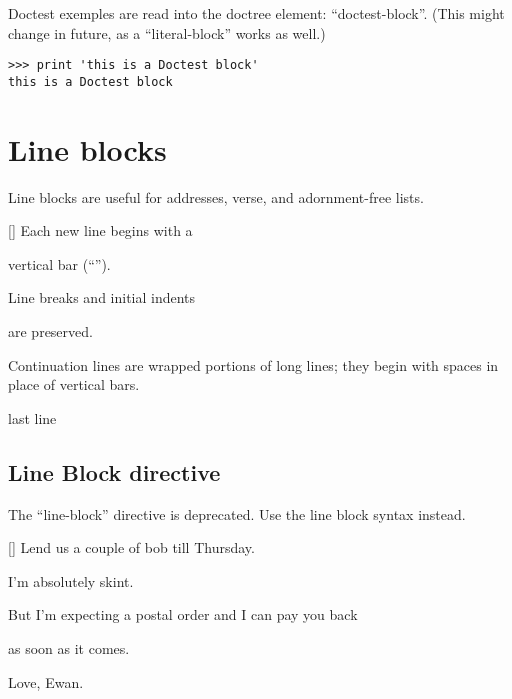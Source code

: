 \documentclass[10pt,a4paper,english]{article}
\newlength{\lineblockindentation}
\newenvironment{lineblock}[1]
{\begin{list}{}
  {\setlength{\partopsep}{\parskip}
   \addtolength{\partopsep}{\baselineskip}
   \topsep0pt\itemsep0.15\baselineskip\parsep0pt
   \leftmargin#1}
 \raggedright}
{\end{list}}
\begin{document}
Doctest exemples are read into the doctree element: ``doctest-block''.
(This might change in future, as a ``literal-block'' works as well.)
\begin{Verbatim}
>>> print 'this is a Doctest block'
this is a Doctest block
\end{Verbatim}



\hypertarget{line-blocks}{}
\section*{Line blocks}

Line blocks are useful for addresses,
verse, and adornment-free lists.

\begin{lineblock}{0em}
\item[] Each new line begins with a
\item[] vertical bar (``{\textbar}'').
\item[]
\begin{lineblock}{\lineblockindentation}
\item[] Line breaks and initial indents
\item[] are preserved.
\end{lineblock}
\item[] Continuation lines are wrapped
portions of long lines; they begin
with spaces in place of vertical bars.
\item[] last line
\end{lineblock}



\hypertarget{line-block-directive}{}
\subsection*{Line Block directive}

The ``line-block'' directive is deprecated. Use the line block syntax instead.

\begin{lineblock}{0em}
\item[] Lend us a couple of bob till Thursday.
\item[] I'm absolutely skint.
\item[] But I'm expecting a postal order and I can pay you back
\item[]
\begin{lineblock}{\lineblockindentation}
\item[] as soon as it comes.
\end{lineblock}
\item[] Love, Ewan.
\end{lineblock}
\end{document}
